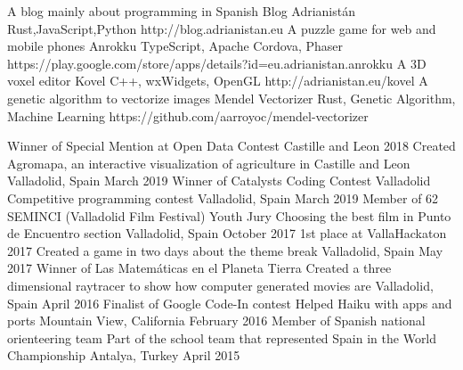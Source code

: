 \documentclass[]{awesome-cv}
\begin{document}
\vspace{-7mm}
\begin{cventries}
	\cventry
	{A blog mainly about programming in Spanish}
	{Blog Adrianistán}
	{Rust,JavaScript,Python}
	{http://blog.adrianistan.eu}
	{}
	\cventry
	{A puzzle game for web and mobile phones}
	{Anrokku}
	{TypeScript, Apache Cordova, Phaser}
	{}
	{https://play.google.com/store/apps/details?id=eu.adrianistan.anrokku}
	\cventry
	{A 3D voxel editor}
	{Kovel}
	{C++, wxWidgets, OpenGL}
	{http://adrianistan.eu/kovel}
	{}
	\cventry
	{A genetic algorithm to vectorize images}
	{Mendel Vectorizer}
	{Rust, Genetic Algorithm, Machine Learning}
	{https://github.com/aarroyoc/mendel-vectorizer}
	{}

	\vspace{-5mm}
\end{cventries}
\begin{cvhonors}
	\cvhonor
	{Winner of Special Mention at Open Data Contest Castille and Leon 2018}
	{Created Agromapa, an interactive visualization of agriculture in Castille and Leon}
	{Valladolid, Spain}
	{March 2019}
	\cvhonor
	{Winner of Catalysts Coding Contest Valladolid}
	{Competitive programming contest}
	{Valladolid, Spain}
	{March 2019}
	\cvhonor
	{Member of 62 SEMINCI (Valladolid Film Festival) Youth Jury}
	{Choosing the best film in Punto de Encuentro section}
	{Valladolid, Spain}
	{October 2017}
	\cvhonor
	{1st place at VallaHackaton 2017}
	{Created a game in two days about the theme \textquotedbl{}break\textquotedbl{}}
	{Valladolid, Spain}
	{May 2017}
	\cvhonor
	{Winner of \textquotedbl{}Las Matemáticas en el Planeta Tierra\textquotedbl{}}
	{Created a three dimensional raytracer to show how computer generated movies are}
	{Valladolid, Spain}
	{April 2016}
	\cvhonor
	{Finalist of Google Code-In contest}
	{Helped Haiku with apps and ports}
	{Mountain View, California}
	{February 2016}
	\cvhonor
	{Member of Spanish national orienteering team}
	{Part of the school team that represented Spain in the World Championship}
	{Antalya, Turkey}
	{April 2015}
\end{cvhonors}
\ 
\end{document}
